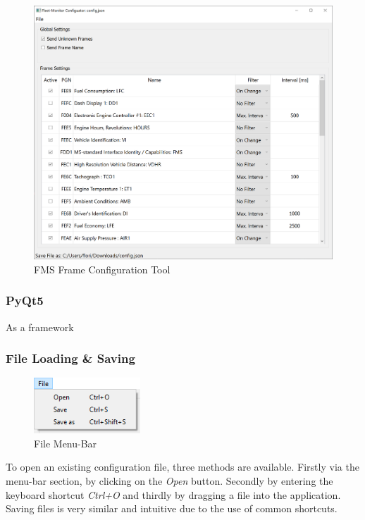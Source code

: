 \medskip
\begin{figure}[h!]
	\centering
	\includegraphics[width=\textwidth]{images/Configuration-Tool_Screenshot}
	\caption{FMS Frame Configuration Tool}
	\label{fig:configuration_tool}
\end{figure}
\newpage

\subsubsection{PyQt5}
As a framework

\subsubsection{File Loading \& Saving}
\begin{figure}
\vspace{-0.6cm}
\includegraphics[width=4.0cm]{images/configuration-tool-file-panel}
\caption{File Menu-Bar}
\end{figure} 
To open an existing configuration file, three methods are available. Firstly via the menu-bar section, by clicking on the \textit{Open} button. Secondly by entering the keyboard shortcut \textit{Ctrl+O} and thirdly by dragging a file into the application. Saving files is very similar and intuitive due to the use of common shortcuts.
\newpage



